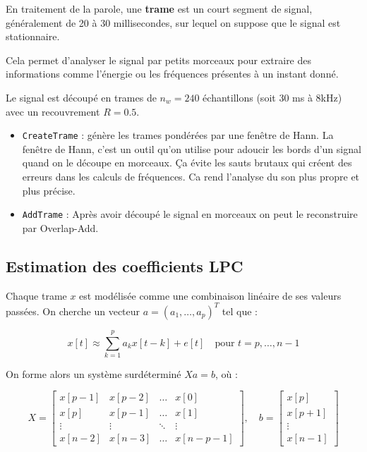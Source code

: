 \documentclass[11pt]{article}
\begin{document}
En traitement de la parole, une \textbf{trame} est un court segment de signal, généralement de 20 à 30 millisecondes, sur lequel on suppose que le signal est stationnaire.

Cela permet d'analyser le signal par petits morceaux pour extraire des informations comme l’énergie ou les fréquences présentes à un instant donné.

Le signal est découpé en trames de \( n_w = 240 \) échantillons (soit 30 ms à 8kHz) avec un recouvrement \( R = 0.5 \).

\begin{itemize}
    \item \texttt{CreateTrame} : génère les trames pondérées par une fenêtre de Hann. La fenêtre de Hann, c’est un outil qu’on utilise pour adoucir les bords d’un signal quand on le découpe en morceaux. Ça évite les sauts brutaux qui créent des erreurs dans les calculs de fréquences. Ca rend l’analyse du son plus propre et plus précise.
    
    \item \texttt{AddTrame} : Après avoir découpé le signal en morceaux on peut le reconstruire par Overlap-Add.
\end{itemize}

\subsection{Estimation des coefficients LPC}

Chaque trame \( x \) est modélisée comme une combinaison linéaire de ses valeurs passées. On cherche un vecteur \( a = (a_1, \ldots, a_p)^T \) tel que :

\[
x[t] \approx \sum_{k=1}^{p} a_k x[t - k] + e[t] \quad \text{pour } t = p, \ldots, n-1
\]

On forme alors un système surdéterminé \( Xa = b \), où :

\[
X =
\begin{bmatrix}
x[p-1] & x[p-2] & \dots & x[0] \\
x[p] & x[p-1] & \dots & x[1] \\
\vdots & \vdots & \ddots & \vdots \\
x[n-2] & x[n-3] & \dots & x[n-p-1]
\end{bmatrix}, \quad
b =
\begin{bmatrix}
x[p] \\
x[p+1] \\
\vdots \\
x[n-1]
\end{bmatrix}
\]
\end{document}
